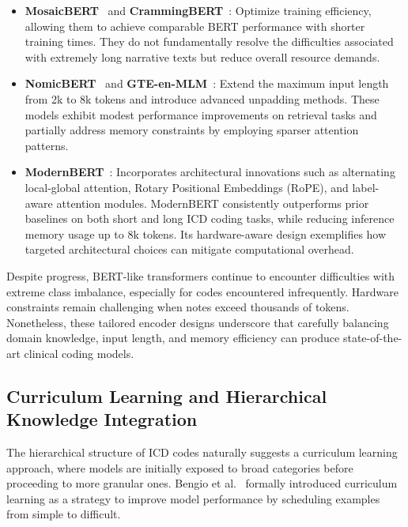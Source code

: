 \begin{itemize}
    \item \textbf{MosaicBERT}~\citep{portes2023mosaicbert} and \textbf{CrammingBERT}~\citep{geiping2023cramming}: Optimize training efficiency, allowing them to achieve comparable BERT performance with shorter training times. They do not fundamentally resolve the difficulties associated with extremely long narrative texts but reduce overall resource demands.
    \item \textbf{NomicBERT}~\citep{nussbaum2024nomicbert} and \textbf{GTE-en-MLM}~\citep{zhang2024gte}: Extend the maximum input length from 2k to 8k tokens and introduce advanced unpadding methods. These models exhibit modest performance improvements on retrieval tasks and partially address memory constraints by employing sparser attention patterns.
    \item \textbf{ModernBERT}~\citep{warner2024modernbert}: Incorporates architectural innovations such as alternating local-global attention, Rotary Positional Embeddings (RoPE), and label-aware attention modules. ModernBERT consistently outperforms prior baselines on both short and long ICD coding tasks, while reducing inference memory usage up to 8k tokens. Its hardware-aware design exemplifies how targeted architectural choices can mitigate computational overhead.
\end{itemize}

Despite progress, BERT-like transformers continue to encounter difficulties with extreme class imbalance, especially for codes encountered infrequently. Hardware constraints remain challenging when notes exceed thousands of tokens. Nonetheless, these tailored encoder designs underscore that carefully balancing domain knowledge, input length, and memory efficiency can produce state-of-the-art clinical coding models.

\subsection{Curriculum Learning and Hierarchical Knowledge Integration}\label{sec:p1:curriculum-learning}

The hierarchical structure of ICD codes naturally suggests a curriculum learning approach, where models are initially exposed to broad categories before proceeding to more granular ones. Bengio et al.~\citep{bengio2009curriculum} formally introduced curriculum learning as a strategy to improve model performance by scheduling examples from simple to difficult.

